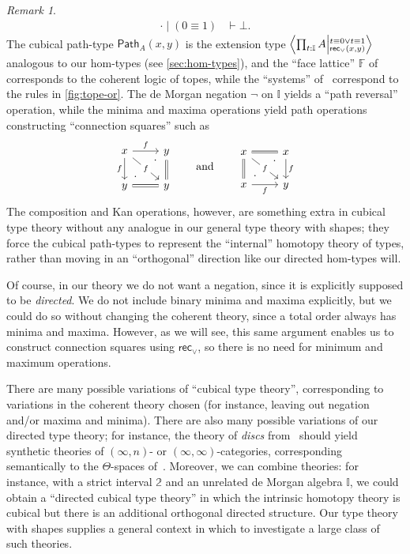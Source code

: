 \documentclass{amsart}
\theoremstyle{plain}
\theoremstyle{definition}
\theoremstyle{remark}
\newtheorem{rmk}[thm]{Remark}
\numberwithin{equation}{section}
\newcommand{\exten}[4]{\left\langle\mathchoice{\textstyle\prod_{#1}}{\textstyle\prod_{#1}}{\scriptstyle\prod_{#1}}{\scriptscriptstyle\prod_{#1}} #2 \middle|^{#3}_{#4}\right\rangle}
\newcommand{\jdeq}{\equiv}
\newcommand{\types}{\vdash}
\newcommand{\rec}{\mathsf{rec}}
\newcommand{\two}{\mathbb{2}}
\newcommand{\dI}{\mathbb{I}}
\begin{document}
\begin{rmk}
\begin{align*}
    \cdot \mid (0\jdeq 1) &\types \bot.
  \end{align*}
  The cubical path-type $\mathsf{Path}_A(x,y)$ is the extension type $\exten{t:\dI}{A}{t\jdeq 0 \lor t\jdeq 1}{\rec_\lor(x,y)}$ analogous to our hom-types (see \cref{sec:hom-types}), and the ``face lattice'' $\mathbb{F}$ of~\cite{CCHM} corresponds to the coherent logic of topes, while the ``systems'' of~\cite{CCHM} correspond to the rules in \cref{fig:tope-or}.
  The de Morgan negation $\neg$ on $\dI$ yields a ``path reversal'' operation, while the minima and maxima operations yield path operations constructing ``connection squares'' such as
  \[
  \begin{tikzcd}
    x \arrow[r, "f"] \arrow[dr, "f" description] \arrow[d, "f"'] & y \arrow[d, equals] \\
    y \arrow[r, equals]  \arrow[ur, phantom, "\cdot" very near start, "\cdot" very near end] & y
  \end{tikzcd}
  \qquad\text{and}\qquad
  \begin{tikzcd}
    x \arrow[r, equals] \arrow[dr, "f" description] \arrow[d, equals] & x \arrow[d, "f"] \\
    x \arrow[r, "f"']  \arrow[ur, phantom, "\cdot" very near start, "\cdot" very near end] & y
  \end{tikzcd}
  \]
  The composition and Kan operations, however, are something extra in cubical type theory without any analogue in our general type theory with shapes; they force the cubical path-types to represent the ``internal'' homotopy theory of types, rather than moving in an ``orthogonal'' direction like our directed hom-types will.

  Of course, in our theory we do not want a negation, since it is explicitly supposed to be \emph{directed}.
  We do not include binary minima and maxima explicitly, but we could do so without changing the coherent theory, since a total order always has minima and maxima.
  However, as we will see, this same argument enables us to construct connection squares using $\rec_\lor$, so there is no need for minimum and maximum operations.

  There are many possible variations of ``cubical type theory'', corresponding to variations in the coherent theory chosen (for instance, leaving out negation and/or maxima and minima).
  There are also many possible variations of our directed type theory; for instance, the theory of \emph{discs} from~\cite{disks} should yield synthetic theories of $(\infty,n)$- or $(\infty,\infty)$-categories, corresponding semantically to the $\Theta$-spaces of~\cite{rezk-theta}.
  Moreover, we can combine theories: for instance, with a strict interval $\two$ and an unrelated de Morgan algebra $\dI$, we could obtain a ``directed cubical type theory'' in which the intrinsic homotopy theory is cubical but there is an additional orthogonal directed structure.
  Our type theory with shapes supplies a general context in which to investigate a large class of such theories.
\end{rmk}
\end{document}
